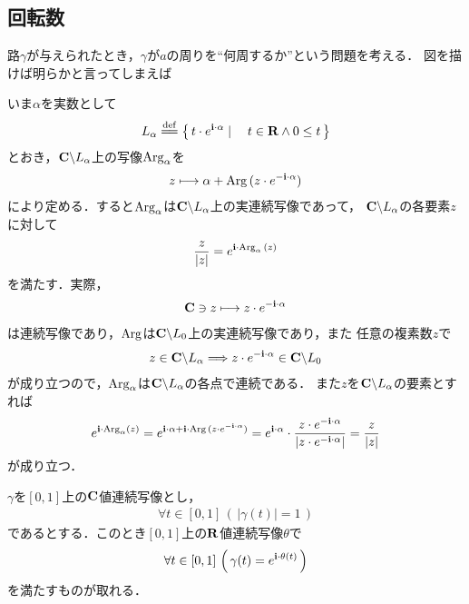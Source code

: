 \subsection{回転数}
	
	路$\gamma$が与えられたとき，$\gamma$が$a$の周りを``何周するか''という問題を考える．
	図を描けば明らかと言ってしまえば
	
	いま$\alpha$を実数として
	\begin{align}
		L_{\alpha} \defeq \Set{t \cdot e^{\isym\cdot\alpha}}{t \in \R \wedge 0 \leq t}
	\end{align}
	とおき，$\mathbf{C} \backslash L_{\alpha}$上の写像$\operatorname{Arg}_{\alpha}$を
	\begin{align}
		z \longmapsto \alpha + \operatorname{Arg}{(z \cdot e^{-\mathbf{i}\cdot\alpha})}
	\end{align}
	により定める．すると$\operatorname{Arg}_{\alpha}$は$\mathbf{C} \backslash L_{\alpha}$上の実連続写像であって，
	$\mathbf{C} \backslash L_{\alpha}$の各要素$z$に対して
	\begin{align}
		\frac{z}{|z|} = e^{\mathbf{i} \cdot \operatorname{Arg}_{\alpha}{(z)}}
	\end{align}
	を満たす．実際，
	\begin{align}
		\mathbf{C} \ni z \longmapsto z \cdot e^{-\mathbf{i} \cdot \alpha}
	\end{align}
	は連続写像であり，$\operatorname{Arg}$は$\mathbf{C} \backslash L_{0}$上の実連続写像であり，また
	任意の複素数$z$で
	\begin{align}
		z \in \mathbf{C} \backslash L_{\alpha} \Longrightarrow z \cdot e^{-\mathbf{i} \cdot \alpha} \in \mathbf{C} \backslash L_{0}
	\end{align}
	が成り立つので，$\operatorname{Arg}_{\alpha}$は$\mathbf{C} \backslash L_{\alpha}$の各点で連続である．
	また$z$を$\mathbf{C} \backslash L_{\alpha}$の要素とすれば
	\begin{align}
		e^{\mathbf{i} \cdot \operatorname{Arg}_{\alpha}(z)}
		= e^{\mathbf{i} \cdot \alpha + \mathbf{i} \cdot \operatorname{Arg}{(z \cdot e^{-\mathbf{i}\cdot\alpha})}}
		= e^{\mathbf{i} \cdot \alpha} \cdot \frac{z \cdot e^{-\mathbf{i}\cdot\alpha}}{\left|z \cdot e^{-\mathbf{i}\cdot\alpha}\right|}
		= \frac{z}{|z|}
	\end{align}
	が成り立つ．
	
	\begin{screen}
		\begin{thm}[路の偏角の連続選択]\label{thm:continuous_choice_of_arguments}
			$\gamma$を$[0,1]$上の$\mathbf{C}$値連続写像とし，
			\begin{align}
				\forall t \in [0,1]\, (\, |\gamma(t)| = 1\, )
			\end{align}
			であるとする．このとき$[0,1]$上の$\mathbf{R}$値連続写像$\theta$で
			\begin{align}
				\forall t \in [0,1]\, \left(\, \gamma(t) = e^{\mathbf{i}\cdot\theta(t)}\, \right)
			\end{align}
			を満たすものが取れる．
		\end{thm}
	\end{screen}
	
